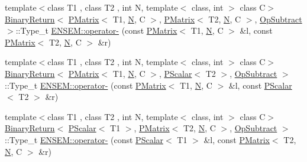 \begin{DoxyCompactItemize}
\item 
{\footnotesize template$<$class T1 , class T2 , int N, template$<$ class, int $>$ class C$>$ }\\\mbox{\hyperlink{structENSEM_1_1BinaryReturn}{Binary\+Return}}$<$ \mbox{\hyperlink{classENSEM_1_1PMatrix}{P\+Matrix}}$<$ T1, \mbox{\hyperlink{adat__devel_2lib_2hadron_2operator__name__util_8cc_a7722c8ecbb62d99aee7ce68b1752f337}{N}}, C $>$, \mbox{\hyperlink{classENSEM_1_1PMatrix}{P\+Matrix}}$<$ T2, \mbox{\hyperlink{adat__devel_2lib_2hadron_2operator__name__util_8cc_a7722c8ecbb62d99aee7ce68b1752f337}{N}}, C $>$, \mbox{\hyperlink{structENSEM_1_1OpSubtract}{Op\+Subtract}} $>$\+::Type\+\_\+t \mbox{\hyperlink{group__primmatrix_ga2f9d8cfed40f93d8bfffe86a9255ed52}{E\+N\+S\+E\+M\+::operator-\/}} (const \mbox{\hyperlink{classENSEM_1_1PMatrix}{P\+Matrix}}$<$ T1, \mbox{\hyperlink{adat__devel_2lib_2hadron_2operator__name__util_8cc_a7722c8ecbb62d99aee7ce68b1752f337}{N}}, C $>$ \&l, const \mbox{\hyperlink{classENSEM_1_1PMatrix}{P\+Matrix}}$<$ T2, \mbox{\hyperlink{adat__devel_2lib_2hadron_2operator__name__util_8cc_a7722c8ecbb62d99aee7ce68b1752f337}{N}}, C $>$ \&r)
\item 
{\footnotesize template$<$class T1 , class T2 , int N, template$<$ class, int $>$ class C$>$ }\\\mbox{\hyperlink{structENSEM_1_1BinaryReturn}{Binary\+Return}}$<$ \mbox{\hyperlink{classENSEM_1_1PMatrix}{P\+Matrix}}$<$ T1, \mbox{\hyperlink{adat__devel_2lib_2hadron_2operator__name__util_8cc_a7722c8ecbb62d99aee7ce68b1752f337}{N}}, C $>$, \mbox{\hyperlink{classENSEM_1_1PScalar}{P\+Scalar}}$<$ T2 $>$, \mbox{\hyperlink{structENSEM_1_1OpSubtract}{Op\+Subtract}} $>$\+::Type\+\_\+t \mbox{\hyperlink{group__primmatrix_gaa44a21f7776bb8fe8502a30e74d88e3f}{E\+N\+S\+E\+M\+::operator-\/}} (const \mbox{\hyperlink{classENSEM_1_1PMatrix}{P\+Matrix}}$<$ T1, \mbox{\hyperlink{adat__devel_2lib_2hadron_2operator__name__util_8cc_a7722c8ecbb62d99aee7ce68b1752f337}{N}}, C $>$ \&l, const \mbox{\hyperlink{classENSEM_1_1PScalar}{P\+Scalar}}$<$ T2 $>$ \&r)
\item 
{\footnotesize template$<$class T1 , class T2 , int N, template$<$ class, int $>$ class C$>$ }\\\mbox{\hyperlink{structENSEM_1_1BinaryReturn}{Binary\+Return}}$<$ \mbox{\hyperlink{classENSEM_1_1PScalar}{P\+Scalar}}$<$ T1 $>$, \mbox{\hyperlink{classENSEM_1_1PMatrix}{P\+Matrix}}$<$ T2, \mbox{\hyperlink{adat__devel_2lib_2hadron_2operator__name__util_8cc_a7722c8ecbb62d99aee7ce68b1752f337}{N}}, C $>$, \mbox{\hyperlink{structENSEM_1_1OpSubtract}{Op\+Subtract}} $>$\+::Type\+\_\+t \mbox{\hyperlink{group__primmatrix_ga6f60741d61098ca196a5f733f86a5835}{E\+N\+S\+E\+M\+::operator-\/}} (const \mbox{\hyperlink{classENSEM_1_1PScalar}{P\+Scalar}}$<$ T1 $>$ \&l, const \mbox{\hyperlink{classENSEM_1_1PMatrix}{P\+Matrix}}$<$ T2, \mbox{\hyperlink{adat__devel_2lib_2hadron_2operator__name__util_8cc_a7722c8ecbb62d99aee7ce68b1752f337}{N}}, C $>$ \&r)

\end{DoxyCompactItemize}
